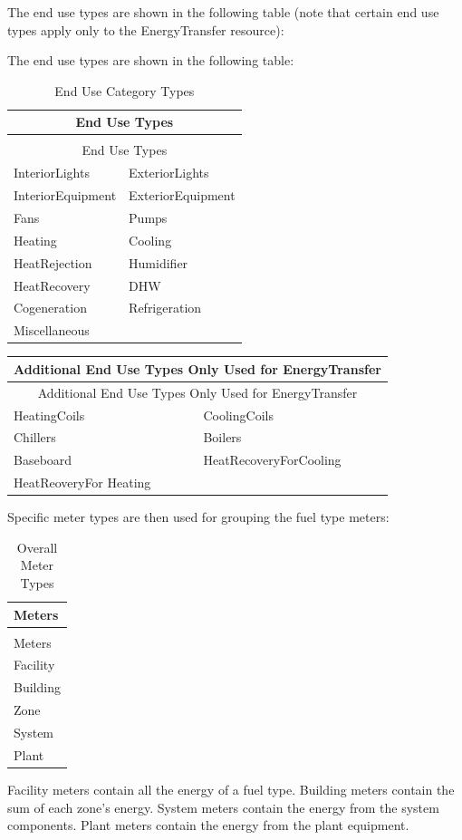The end use types are shown in the following table (note that certain end use types apply only to the EnergyTransfer resource):

The end use types are shown in the following table:

\begin{longtable}[c]{@{}ll@{}}
\caption{End Use Category Types \label{table:end-use-category-types}} \tabularnewline
\toprule
\multicolumn{2}{c}{End Use Types} \tabularnewline
\midrule
\endfirsthead

\caption[]{End Use Category Types} \tabularnewline
\toprule
\multicolumn{2}{c}{End Use Types} \tabularnewline
\midrule
\endhead

  InteriorLights & ExteriorLights \tabularnewline
  InteriorEquipment & ExteriorEquipment \tabularnewline
  Fans & Pumps \tabularnewline
  Heating & Cooling \tabularnewline
  HeatRejection & Humidifier \tabularnewline
  HeatRecovery & DHW \tabularnewline
  Cogeneration & Refrigeration \tabularnewline
  Miscellaneous & \tabularnewline
\bottomrule
\end{longtable}

\begin{longtable}[c]{@{}ll@{}}
\toprule
\multicolumn{2}{c}{Additional End Use Types Only Used for EnergyTransfer} \tabularnewline
\midrule
\endfirsthead

\toprule
\multicolumn{2}{c}{Additional End Use Types Only Used for EnergyTransfer} \tabularnewline
\midrule
\endhead

HeatingCoils & CoolingCoils \tabularnewline
Chillers & Boilers \tabularnewline
Baseboard & HeatRecoveryForCooling \tabularnewline
HeatReoveryFor Heating & \tabularnewline
\bottomrule
\end{longtable}

Specific meter types are then used for grouping the fuel type meters:

\begin{longtable}[c]{@{}l@{}}
\caption{Overall Meter Types \label{table:overall-meter-types}} \tabularnewline
\toprule
Meters \tabularnewline
\midrule
\endfirsthead

\caption[]{Overall Meter Types} \tabularnewline
\toprule
Meters \tabularnewline
\midrule
\endhead

Facility \tabularnewline
Building \tabularnewline
Zone \tabularnewline
System \tabularnewline
Plant \tabularnewline
\bottomrule
\end{longtable}

Facility meters contain all the energy of a fuel type. Building meters contain the sum of each zone’s energy. System meters contain the energy from the system components. Plant meters contain the energy from the plant equipment.

